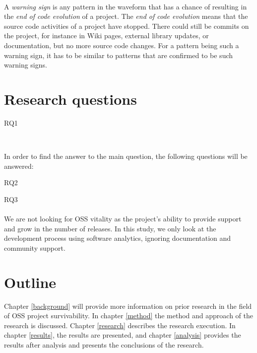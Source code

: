 \paragraph{}
A \emph{warning sign }\rm is any pattern in the waveform that has a chance of
resulting in the \emph{end of code evolution }\rm of a project. The \emph{end of
code evolution }\rm means that the source code activities of a project have
stopped. There could still be commits on the project, for instance in Wiki
pages, external library updates, or documentation, but no more source code
changes. For a pattern being such a warning sign, it has to be similar to
patterns that are confirmed to be such warning signs.



\section{Research questions}
\label{questions}

\begin{description}
	\item[RQ1] \emph{\researchQuestion}\\[0.3cm]
\end{description}

\noindent
In order to find the answer to the main question, the following
questions will be answered:
\begin{description}
	\item[RQ2] \emph{\subQuestionOne}
	\item[RQ3] \emph{\subQuestionTwo}
\end{description}

\paragraph{}
We are not looking for OSS vitality as the project's ability to provide support
and grow in the number of releases. In this study, we only look at the
development process using software analytics, ignoring documentation and
community support.

\section{Outline}

Chapter \ref{background} will provide more information on prior research in the
field of OSS project survivability. In chapter \ref{method} the method and
approach of the research is discussed. Chapter \ref{research} describes the
research execution. In chapter \ref{results}, the results are presented, and
chapter \ref{analysis} provides the results after analysis and presents the
conclusions of the research.

